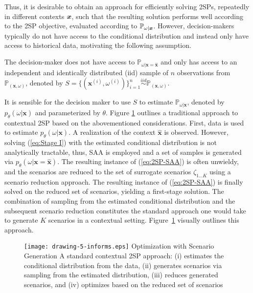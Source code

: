 Thus, it is desirable to obtain an approach for efficiently solving 2SPs, repeatedly in different contexts $\boldsymbol{x}$, such that the resulting solution performs well according to the 2SP objective, evaluated according to $\mathbb{P}_{\omega | \boldsymbol{x}}$. However, decision-makers typically do not have access to the conditional distribution and instead only have access to historical data, motivating the following assumption.
\begin{assumption}\label{a3}
 The decision-maker does not have access to {\small $\mathbb{P}_{\omega|\boldsymbol{x} = \hat{\boldsymbol{x}}}$} and only has access to an independent and identically distributed (iid) sample of $n$ observations from {\small $\mathbb{P}_{(\boldsymbol{x}, \omega)}$}, denoted by {\small $S = \{(\boldsymbol{x}^{(i)}, \omega^{(i)})\}_{i=1}^{n} \overset{iid}{\sim} \mathbb{P}_{(\boldsymbol{x}, \omega)}$}. 
\end{assumption}

It is sensible for the decision maker to use $S$ to estimate $\mathbb{P}_{\omega|\boldsymbol{x}}$, denoted by $p_{\theta}(\omega | \boldsymbol{x})$ and parameterized by $\theta$. Figure \ref{fig:fig1} outlines a traditional approach to contextual 2SP based on the abovementioned considerations. First, data is used to estimate $p_{\theta}(\omega | \boldsymbol{x})$. A realization of the context $\hat{\boldsymbol{x}}$ is observed. However, solving (\ref{eq:Stage I}) with the estimated conditional distribution is not analytically tractable, thus, SAA is employed and a set of samples is generated via $p_{\theta}(\omega | \boldsymbol{x} = \hat{\boldsymbol{x}})$. The resulting instance of \hbox{(\ref{eq:2SP-SAA})} is often unwieldy, and the scenarios are reduced to the set of surrogate scenarios $\zeta_{1...K}$ using a scenario reduction approach. The resulting instance of (\ref{eq:2SP-SAA}) is finally solved on the reduced set of scenarios, yielding a first-stage solution. The combination of sampling from the estimated conditional distribution and the subsequent scenario reduction constitutes the standard approach one would take to generate $K$ scenarios in a contextual setting. \hbox{Figure \ref{fig:fig1}} visually outlines this approach.


\begin{figure}
    \FIGURE
{\texttt{[image: drawing-5-informs.eps]}}
{Optimization with Scenario Generation \label{fig:fig1}}
{A standard contextual 2SP approach: (i) estimates the conditional distribution from the data, (ii) generates scenarios via sampling from the estimated distribution, (iii) reduces generated scenarios, and (iv) optimizes based on the reduced set of scenarios }
\end{figure}

